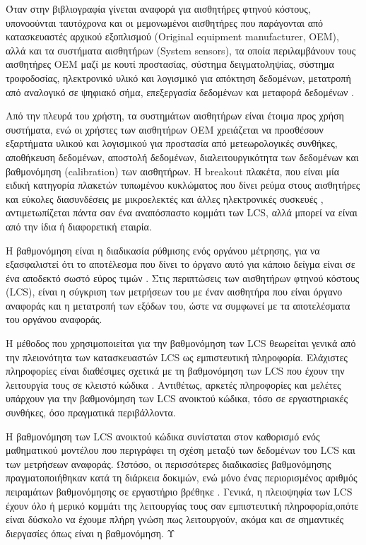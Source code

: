 Όταν στην βιβλιογραφία γίνεται αναφορά για αισθητήρες φτηνού κόστους, 
υπονοούνται ταυτόχρονα και οι μεμονωμένοι αισθητήρες που παράγονται από κατασκευαστές αρχικού εξοπλισμού (Original equipment manufacturer, OEM),
αλλά και τα συστήματα αισθητήρων (System sensors), τα οποία περιλαμβάνουν τους αισθητήρες OEM μαζί με κουτί προστασίας, 
σύστημα δειγματοληψίας, σύστημα τροφοδοσίας, ηλεκτρονικό υλικό και λογισμικό για απόκτηση δεδομένων, μετατροπή από αναλογικό σε ψηφιακό σήμα, επεξεργασία δεδομένων και μεταφορά δεδομένων \cite{atmos10090506}.

Από την πλευρά του χρήστη, τα συστημάτων αισθητήρων είναι έτοιμα προς χρήση συστήματα, ενώ οι χρήστες των αισθητήρων OEM χρειάζεται να προσθέσουν εξαρτήματα υλικού και λογισμικού για προστασία από μετεωρολογικές συνθήκες, αποθήκευση δεδομένων, αποστολή δεδομένων, 
διαλειτουργικότητα των δεδομένων και βαθμονόμηση (calibration) των αισθητήρων.
Η breakout πλακέτα, που είναι μία ειδική κατηγορία πλακετών τυπωμένου κυκλώματος που δίνει ρεύμα στους αισθητήρες και εύκολες διασυνδέσεις με μικροελεκτές και άλλες ηλεκτρονικές συσκευές \cite{JLCPCB2024},
αντιμετωπίζεται πάντα σαν ένα αναπόσπαστο κομμάτι των LCS, αλλά μπορεί να είναι από την ίδια ή διαφορετική εταιρία.

Η βαθμονόμηση είναι η διαδικασία ρύθμισης ενός οργάνου μέτρησης, για να εξασφαλιστεί ότι το αποτέλεσμα που δίνει το όργανο αυτό για κάποιο δείγμα είναι σε ένα αποδεκτό σωστό εύρος τιμών \cite{Kotsonis2024}.
Στις περιπτώσεις των αισθητήρων φτηνού κόστους (LCS), είναι η σύγκριση των μετρήσεων του με έναν αισθητήρα που είναι όργανο αναφοράς και η μετατροπή των εξόδων του, ώστε να συμφωνεί με τα αποτελέσματα του οργάνου αναφοράς.

Η μέθοδος που χρησιμοποιείται για την βαθμονόμηση των LCS θεωρείται γενικά από την πλειονότητα των κατασκευαστών LCS ως εμπιστευτική πληροφορία.
Ελάχιστες πληροφορίες είναι διαθέσιμες σχετικά με τη βαθμονόμηση των LCS που έχουν την λειτουργία τους σε κλειστό κώδικα . 
Αντιθέτως, αρκετές πληροφορίες και μελέτες υπάρχουν για την βαθμονόμηση των LCS ανοικτού κώδικα, τόσο σε εργαστηριακές συνθήκες, όσο  πραγματικά περιβάλλοντα. 

Η βαθμονόμηση των LCS ανοικτού κώδικα συνίσταται στον καθορισμό ενός μαθηματικού μοντέλου που περιγράφει τη σχέση μεταξύ των δεδομένων του LCS και των μετρήσεων αναφοράς.
Ωστόσο, οι περισσότερες διαδικασίες βαθμονόμησης πραγματοποιήθηκαν κατά τη διάρκεια δοκιμών, ενώ μόνο ένας περιορισμένος αριθμός πειραμάτων βαθμονόμησης σε εργαστήριο βρέθηκε \cite{atmos10090506}.
Γενικά, η πλειοψηφία των LCS έχουν όλο ή μερικό κομμάτι της λειτουργίας τους σαν εμπιστευτική πληροφορία,οπότε είναι δύσκολο να έχουμε πλήρη γνώση πως λειτουργούν,
ακόμα και σε σημαντικές διεργασίες όπως είναι η βαθμονόμηση.
Υ

